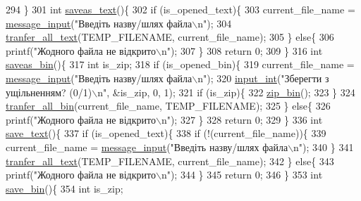 \begin{DoxyCodeInclude}
{{{{{294 \}
301 \textcolor{keywordtype}{int} \hyperlink{main_8c_aa933ed08d69becf14df3affc9194e344}{saveas\_text}()\{
302     \textcolor{keywordflow}{if} (is\_opened\_text)\{
303         current\_file\_name = \hyperlink{lab__functions_8h_a53c0a255092a68903d4627229c37d7d0}{message\_input}(\textcolor{stringliteral}{"Введіть назву/шлях файла\(\backslash\)n"});
304         \hyperlink{main_8c_a2d8c16830ee01715bd19345746ffb070}{tranfer\_all\_text}(TEMP\_FILENAME, current\_file\_name);
305     \} \textcolor{keywordflow}{else}\{
306         printf(\textcolor{stringliteral}{"Жодного файла не відкрито\(\backslash\)n"});
307     \}
308     \textcolor{keywordflow}{return} 0;
309 \}
316 \textcolor{keywordtype}{int} \hyperlink{main_8c_af14b38f404742efadc398c51b9830f6c}{saveas\_bin}()\{
317     \textcolor{keywordtype}{int} is\_zip;
318     \textcolor{keywordflow}{if} (is\_opened\_bin)\{
319         current\_file\_name = \hyperlink{lab__functions_8h_a53c0a255092a68903d4627229c37d7d0}{message\_input}(\textcolor{stringliteral}{"Введіть назву/шлях файла\(\backslash\)n"});
320         \hyperlink{lab__functions_8h_a6f453bc035d85e967bd5032eca31a155}{input\_int}(\textcolor{stringliteral}{"Зберегти з ущільненням? (0/1)\(\backslash\)n"}, &is\_zip, 0, 1);
321         \textcolor{keywordflow}{if} (is\_zip)\{
322             \hyperlink{main_8c_a56f7f6edbc88169ca7785ff69d03396e}{zip\_bin}();
323         \}
324         \hyperlink{main_8c_a0225750ccc073d7680cae540419b124a}{tranfer\_all\_bin}(current\_file\_name, TEMP\_FILENAME);
325     \} \textcolor{keywordflow}{else}\{
326         printf(\textcolor{stringliteral}{"Жодного файла не відкрито\(\backslash\)n"});
327     \}
328     \textcolor{keywordflow}{return} 0;
329 \}
336 \textcolor{keywordtype}{int} \hyperlink{main_8c_adcaf3a4fe6a5d1223e9d28382d74c8fe}{save\_text}()\{
337     \textcolor{keywordflow}{if} (is\_opened\_text)\{
338         \textcolor{keywordflow}{if} (!(current\_file\_name))\{
339             current\_file\_name = \hyperlink{lab__functions_8h_a53c0a255092a68903d4627229c37d7d0}{message\_input}(\textcolor{stringliteral}{"Введіть назву/шлях файла\(\backslash\)n"});
340         \}
341         \hyperlink{main_8c_a2d8c16830ee01715bd19345746ffb070}{tranfer\_all\_text}(TEMP\_FILENAME, current\_file\_name);
342     \} \textcolor{keywordflow}{else}\{
343         printf(\textcolor{stringliteral}{"Жодного файла не відкрито\(\backslash\)n"});
344     \}
345     \textcolor{keywordflow}{return} 0;
346 \}
353 \textcolor{keywordtype}{int} \hyperlink{main_8c_ade34d6c87a837a130af82aa7b13db885}{save\_bin}()\{
354     \textcolor{keywordtype}{int} is\_zip;
}}}}}
\end{DoxyCodeInclude}
